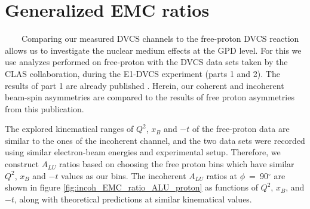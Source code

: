 \section{Generalized EMC ratios} \label{sec:Generalized_EMC}
~~~~Comparing our measured DVCS channels to the free-proton DVCS reaction 
allows us to investigate the nuclear medium effects at the GPD level. For this 
we use analyzes performed on free-proton with the DVCS data sets taken by the CLAS 
collaboration, during the E1-DVCS experiment (parts 1 and 2). The results of 
part 1 are already published \cite{FX_BSA, CLAS_cross_section}. Herein, our 
coherent and incoherent beam-spin asymmetries are compared to the results of
free proton asymmetries from this publication.


The explored kinematical ranges of $Q^2$, $x_{B}$ and $-t$ of the free-proton 
data are similar to the ones of the incoherent channel, and the two data sets 
were recorded using similar electron-beam energies and experimental setup.  
Therefore, we construct $A_{LU}$ ratios based on choosing the free proton bins 
which have similar $Q^2$, $x_{B}$ and $-t$ values as our bins. The incoherent 
$A_{LU}$ ratios at $\phi$~=~90$^{\circ}$ are shown in figure 
\ref{fig:incoh_EMC_ratio_ALU_proton} as functions of $Q^{2}$, $x_{B}$, and 
$-t$, along with theoretical predictions at similar kinematical values.\\
  
